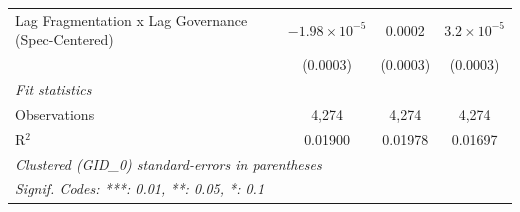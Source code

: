 \begin{table}[H]
\begin{tabular}{lccc}
      Lag Fragmentation x Lag Governance (Spec-Centered) & $-1.98\times 10^{-5}$       & 0.0002                           & $3.2\times 10^{-5}$\\    
                                                         & (0.0003)                    & (0.0003)                         & (0.0003)\\   
      \midrule
      \emph{Fit statistics}\\
      Observations                                       & 4,274                       & 4,274                            & 4,274\\  
      R$^2$                                              & 0.01900                     & 0.01978                          & 0.01697\\  
      \midrule \midrule
      \multicolumn{4}{l}{\emph{Clustered (GID\_0) standard-errors in parentheses}}\\
      \multicolumn{4}{l}{\emph{Signif. Codes: ***: 0.01, **: 0.05, *: 0.1}}\\
   \end{tabular}
\end{table}


